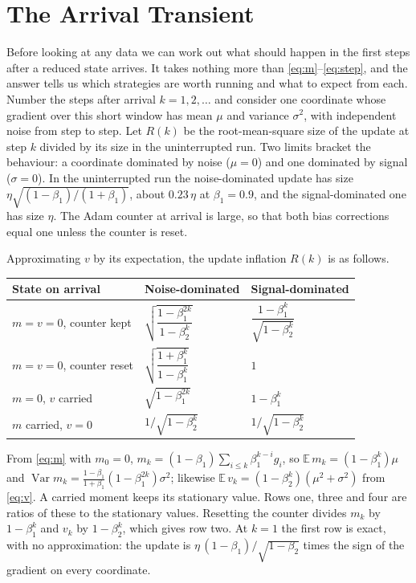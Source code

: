 \section{The Arrival Transient}
\label{sec:transient}

Before looking at any data we can work out what should happen in the first steps after a reduced state arrives.
It takes nothing more than \eqref{eq:m}--\eqref{eq:step}, and the answer tells us which strategies are worth running
and what to expect from each. Number the steps after
arrival $k = 1, 2, \dots$ and consider one coordinate whose gradient over this short window has mean $\mu$ and variance
$\sigma^2$, with independent noise from step to step. Let $R(k)$ be the root-mean-square size of the update at step
$k$ divided by its size in the uninterrupted run. Two limits bracket the behaviour: a coordinate dominated by noise
($\mu = 0$) and one dominated by signal ($\sigma = 0$). In the uninterrupted run the noise-dominated update has
size $\eta\sqrt{(1-\beta_1)/(1+\beta_1)}$, about $0.23\,\eta$ at $\beta_1 = 0.9$, and the signal-dominated one has
size $\eta$. The Adam counter at arrival is large, so that both bias corrections equal one unless the counter is reset.

\begin{proposition}
\label{prop:transient}
Approximating $v$ by its expectation, the update inflation $R(k)$ is as follows.

\smallskip
\noindent\small\setlength{\tabcolsep}{3pt}\begin{tabular}{@{}lll@{}}
\toprule
State on arrival & Noise-dominated & Signal-dominated \\
\midrule
$m = v = 0$, counter kept & $\sqrt{\dfrac{1-\beta_1^{2k}}{1-\beta_2^{k}}}$ & $\dfrac{1-\beta_1^{k}}{\sqrt{1-\beta_2^{k}}}$ \\[2.2ex]
$m = v = 0$, counter reset & $\sqrt{\dfrac{1+\beta_1^{k}}{1-\beta_1^{k}}}$ & $1$ \\[2.2ex]
$m = 0$, $v$ carried & $\sqrt{1-\beta_1^{2k}}$ & $1-\beta_1^{k}$ \\[1.2ex]
$m$ carried, $v = 0$ & $1/\sqrt{1-\beta_2^{k}}$ & $1/\sqrt{1-\beta_2^{k}}$ \\
\bottomrule
\end{tabular}
\end{proposition}

\begin{IEEEproof}
From \eqref{eq:m} with $m_0 = 0$, $m_k = (1-\beta_1)\sum_{i \le k} \beta_1^{k-i} g_i$, so
$\mathbb{E}\,m_k = (1-\beta_1^k)\mu$ and
$\operatorname{Var} m_k = \frac{1-\beta_1}{1+\beta_1}(1-\beta_1^{2k})\sigma^2$; likewise
$\mathbb{E}\,v_k = (1-\beta_2^k)(\mu^2+\sigma^2)$ from \eqref{eq:v}. A carried moment keeps its stationary value. Rows one,
three and four are ratios of these to the stationary values. Resetting the counter divides $m_k$ by $1-\beta_1^k$ and
$v_k$ by $1-\beta_2^k$, which gives row two. At $k = 1$ the first row is exact, with no approximation: the update is
$\eta\,(1-\beta_1)/\sqrt{1-\beta_2}$ times the sign of the gradient on every coordinate.
\end{IEEEproof}

